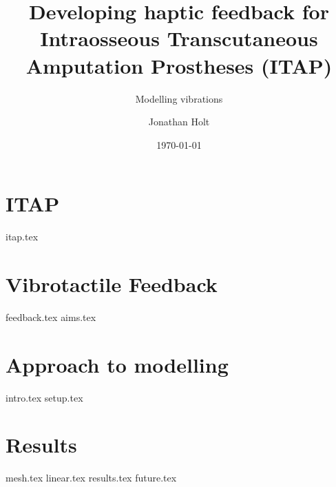 \documentclass[final]{beamer}
\title{Developing haptic feedback for Intraosseous Transcutaneous Amputation Prostheses (ITAP)}
\subtitle{Modelling vibrations}
\author{Jonathan Holt}
\institute[Biomedical Engineering]{Dept. of Medical Physics \& Biomedical Engineering}
\date{\today}
\begin{document}
\begin{frame}
	\titlepage
\end{frame}

\section{ITAP}
	{itap.tex}
\section{Vibrotactile Feedback}
	{feedback.tex}
	{aims.tex}

\section{Approach to modelling}
	{intro.tex}
	{setup.tex}
\section{Results}
	{mesh.tex}
	{linear.tex}
	{results.tex}
	{future.tex}
\begin{frame}
\end{frame}
\end{document}
